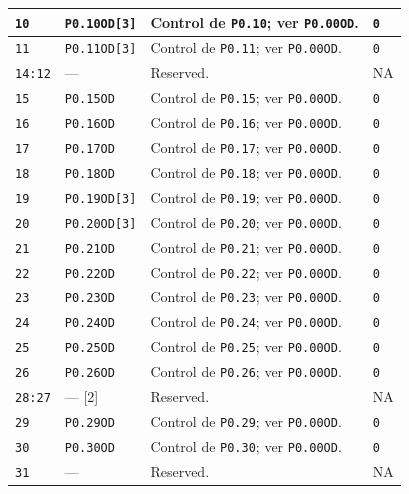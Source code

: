 \begin{longtable}{|>{\raggedright\arraybackslash}p{}|>{\raggedright\arraybackslash}p{}|>{\raggedright\arraybackslash}p{}|>{\centering\arraybackslash}p{}|}
\texttt{10} & \texttt{P0.10OD[3]} & Control de \texttt{P0.10}; ver \texttt{P0.00OD}. & \texttt{0} \\
\hline
\texttt{11} & \texttt{P0.11OD[3]} & Control de \texttt{P0.11}; ver \texttt{P0.00OD}. & \texttt{0} \\
\hline
\texttt{14:12} & --- & Reserved. & NA \\
\hline
\texttt{15} & \texttt{P0.15OD} & Control de \texttt{P0.15}; ver \texttt{P0.00OD}. & \texttt{0} \\
\hline
\texttt{16} & \texttt{P0.16OD} & Control de \texttt{P0.16}; ver \texttt{P0.00OD}. & \texttt{0} \\
\hline
\texttt{17} & \texttt{P0.17OD} & Control de \texttt{P0.17}; ver \texttt{P0.00OD}. & \texttt{0} \\
\hline
\texttt{18} & \texttt{P0.18OD} & Control de \texttt{P0.18}; ver \texttt{P0.00OD}. & \texttt{0} \\
\hline
\texttt{19} & \texttt{P0.19OD[3]} & Control de \texttt{P0.19}; ver \texttt{P0.00OD}. & \texttt{0} \\
\hline
\texttt{20} & \texttt{P0.20OD[3]} & Control de \texttt{P0.20}; ver \texttt{P0.00OD}. & \texttt{0} \\
\hline
\texttt{21} & \texttt{P0.21OD} & Control de \texttt{P0.21}; ver \texttt{P0.00OD}. & \texttt{0} \\
\hline
\texttt{22} & \texttt{P0.22OD} & Control de \texttt{P0.22}; ver \texttt{P0.00OD}. & \texttt{0} \\
\hline
\texttt{23} & \texttt{P0.23OD} & Control de \texttt{P0.23}; ver \texttt{P0.00OD}. & \texttt{0} \\
\hline
\texttt{24} & \texttt{P0.24OD} & Control de \texttt{P0.24}; ver \texttt{P0.00OD}. & \texttt{0} \\
\hline
\texttt{25} & \texttt{P0.25OD} & Control de \texttt{P0.25}; ver \texttt{P0.00OD}. & \texttt{0} \\
\hline
\texttt{26} & \texttt{P0.26OD} & Control de \texttt{P0.26}; ver \texttt{P0.00OD}. & \texttt{0} \\
\hline
\texttt{28:27} & --- [2] & Reserved. & NA \\
\hline
\texttt{29} & \texttt{P0.29OD} & Control de \texttt{P0.29}; ver \texttt{P0.00OD}. & \texttt{0} \\
\hline
\texttt{30} & \texttt{P0.30OD} & Control de \texttt{P0.30}; ver \texttt{P0.00OD}. & \texttt{0} \\
\hline
\texttt{31} & --- & Reserved. & NA \\
\hline
\end{longtable}
